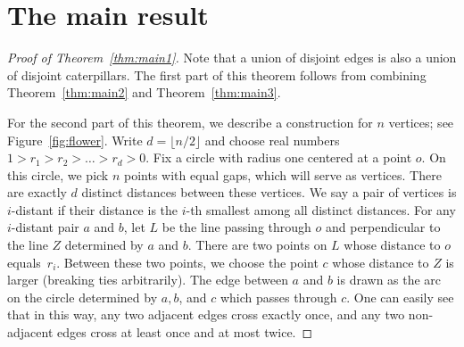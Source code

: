\documentclass[a4paper,UKenglish,cleveref, autoref, thm-restate]{lipics_arxiv}
\begin{document}
\section{The main result}\label{sec:main}

\begin{proof}[Proof of Theorem~\ref{thm:main1}]
Note that a union of disjoint edges is also a union of disjoint caterpillars. The first part of this theorem follows from combining Theorem~\ref{thm:main2} and Theorem~\ref{thm:main3}.

For the second part of this theorem, we describe a construction for $n$ vertices; see Figure~\ref{fig:flower}. Write $d = \lfloor n/2 \rfloor$ and choose real numbers $1 > r_1 > r_2 > \dots > r_d > 0$. Fix a circle with radius one centered at a point $o$. On this circle, we pick $n$ points with equal gaps, which will serve as vertices. There are exactly $d$ distinct distances between these vertices. We say a pair of vertices is $i$-distant if their distance is the $i$-th smallest among all distinct distances. For any $i$-distant pair $a$ and $b$, let $L$ be the line passing through $o$ and perpendicular to the line $Z$ determined by $a$ and $b$. There are two points on $L$ whose distance to $o$ equals~$r_i$. Between these two points, we choose the point $c$ whose distance to $Z$ is larger (breaking ties arbitrarily). The edge between $a$ and $b$ is drawn as the arc on the circle determined by $a,b$, and $c$ which passes through $c$. One can easily see that in this way, any two adjacent edges cross exactly once, and any two non-adjacent edges cross at least once and at most twice.
\end{proof}
\end{document}

